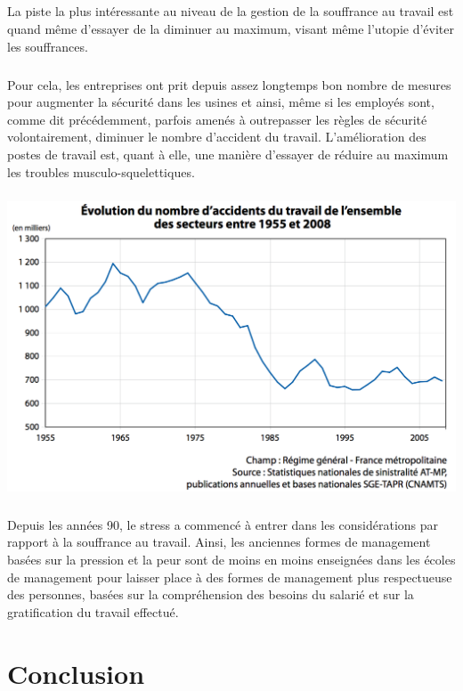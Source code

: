 \documentclass{report}
\begin{document}
		\paragraph{}
			La piste la plus intéressante au niveau de la gestion de la souffrance au travail est quand même d'essayer de la diminuer au maximum, visant même l'utopie d'éviter les souffrances.
		\paragraph{}
			Pour cela, les entreprises ont prit depuis assez longtemps bon nombre de mesures pour augmenter la sécurité dans les usines et ainsi, même si les employés sont, comme dit précédemment, parfois amenés à outrepasser les règles de sécurité volontairement, diminuer le nombre d'accident du travail. L'amélioration des postes de travail est, quant à elle, une manière d'essayer de réduire au maximum les troubles musculo-squelettiques.
		\paragraph{}
			\begin{center}
				\includegraphics[scale=0.3]{graph1.png}
			\end{center}
		\paragraph{}
			Depuis les années 90, le stress a commencé à entrer dans les considérations par rapport à la souffrance au travail. Ainsi, les anciennes formes de management basées sur la pression et la peur sont de moins en moins enseignées dans les écoles de management pour laisser place à des formes de management plus respectueuse des personnes, basées sur la compréhension des besoins du salarié et sur la gratification du travail effectué. 
\chapter*{Conclusion}
    \paragraph*{}
         
\end{document}
